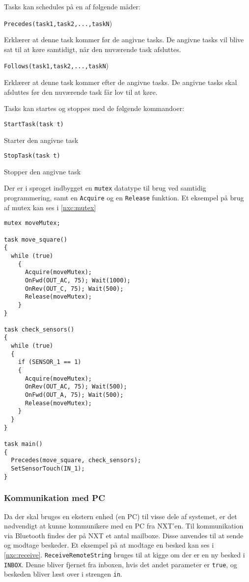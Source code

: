 Tasks kan schedules på en af følgende måder:

\begin{description}
\item{\lstinline[style=c]!Precedes(task1,task2,...,taskN!)}

Erklærer at denne task kommer før de angivne tasks. 
De angivne tasks vil blive sat til at køre samtidigt, når den nuværende task afsluttes.
\item{\lstinline[style=c]!Follows(task1,task2,...,taskN!)}

Erklærer at denne task kommer efter de angivne tasks. 
De angivne tasks skal afsluttes før den nuværende task får lov til at køre.
\end{description}

Tasks kan startes og stoppes med de følgende kommandoer:

\begin{description}
\item{\lstinline[style=c]!StartTask(task t)!}

Starter den angivne task

\item{\lstinline[style=c]!StopTask(task t)!}

Stopper den angivne task
\end{description}

Der er i sproget indbygget en \lstinline[style=c]!mutex! datatype til brug ved samtidig programmering, samt en \lstinline[style=c]!Acquire! og en \lstinline[style=c]!Release! funktion.
Et eksempel på brug af mutex kan ses i \cref{nxc:mutex}

\begin{lstlisting}[style=c,label=nxc:mutex, caption={Eksempel på brug af mutex.}]
mutex moveMutex;

task move_square()
{
  while (true)
    {
      Acquire(moveMutex);
      OnFwd(OUT_AC, 75); Wait(1000);
      OnRev(OUT_C, 75); Wait(500);
      Release(moveMutex);
    }
}

task check_sensors()
{
  while (true)
  {
    if (SENSOR_1 == 1)
    {
      Acquire(moveMutex);
      OnRev(OUT_AC, 75); Wait(500);
      OnFwd(OUT_A, 75); Wait(500);
      Release(moveMutex);
    }
  }
}

task main()
{
  Precedes(move_square, check_sensors);
  SetSensorTouch(IN_1);
}
\end{lstlisting}

\subsubsection{Kommunikation med PC}
Da der skal bruges en ekstern enhed (en PC) til visse dele af systemet, er det nødvendigt at kunne kommunikere med en PC fra NXT'en.
Til kommunikation via Bluetooth findes der på NXT et antal mailboxe.
Disse anvendes til at sende og modtage beskeder.
Et eksempel på at modtage en besked kan ses i \cref{nxc:receive}.
\lstinline[style=c]|ReceiveRemoteString| bruges til at kigge om der er en ny besked i \lstinline[style=c]!INBOX!.
Denne bliver fjernet fra inboxen, hvis det andet parameter er \lstinline[style=c]|true|, og beskeden bliver læst over i strengen \lstinline[style=c]|in|.

